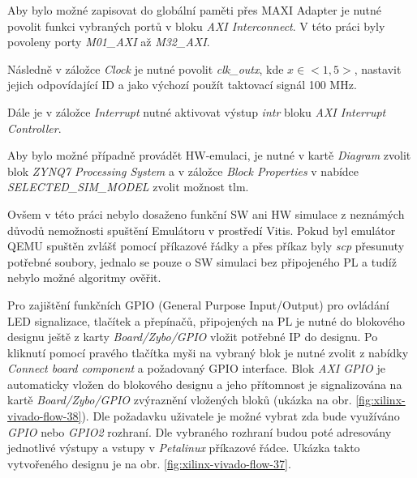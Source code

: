 \documentclass[a4paper, twoside, 11pt]{article}
\begin{document}
		Aby bylo možné zapisovat do globální paměti přes MAXI Adapter je nutné povolit funkci vybraných portů v bloku \textit{AXI Interconnect}. V této práci byly povoleny porty \textit{M01\_AXI} až \textit{M32\_AXI}.\par
		Následně v záložce \textit{Clock} je nutné povolit \textit{clk\_outx}, kde $x \in <1,5>$, nastavit jejich odpovídající ID a jako výchozí použít taktovací signál 100 MHz.\par
		Dále je v záložce \textit{Interrupt} nutné aktivovat výstup \textit{intr} bloku \textit{AXI Interrupt Controller}.\par
		Aby bylo možné případně provádět HW-emulaci, je nutné v kartě \textit{Diagram} zvolit blok \textit{ZYNQ7 Processing System} a v záložce \textit{Block Properties} v nabídce \textit{SELECTED\_SIM\_MODEL} zvolit možnost tlm. \cite{hackster-vitis-2021-1-embedded-platform-for-zybo-z7-20}\par
		Ovšem v této práci nebylo dosaženo funkční SW ani HW simulace z neznámých důvodů nemožnosti spuštění Emulátoru v prostředí Vitis. Pokud byl emulátor QEMU spuštěn zvlášť pomocí příkazové řádky a přes příkaz byly \textit{scp} přesunuty potřebné soubory, jednalo se pouze o SW simulaci bez připojeného PL a tudíž nebylo možné algoritmy ověřit.\par
		Pro zajištění funkčních GPIO (General Purpose Input/Output) pro ovládání LED signalizace, tlačítek a přepínačů, připojených na PL je nutné do blokového designu ještě z karty \textit{Board/Zybo/GPIO} vložit potřebné IP do designu. Po kliknutí pomocí pravého tlačítka myši na vybraný blok je nutné zvolit z nabídky \textit{Connect board component} a požadovaný GPIO interface. Blok \textit{AXI GPIO} je automaticky vložen do blokového designu a jeho přítomnost je signalizována na kartě \textit{Board/Zybo/GPIO} zvýraznění vložených bloků (ukázka na obr. \ref{fig:xilinx-vivado-flow-38}). Dle požadavku uživatele je možné vybrat zda bude využíváno \textit{GPIO} nebo \textit{GPIO2} rozhraní. Dle vybraného rozhraní budou poté adresovány jednotlivé výstupy a vstupy v \textit{Petalinux} příkazové řádce. Ukázka takto vytvořeného designu je na obr. \ref{fig:xilinx-vivado-flow-37}.
\end{document}
